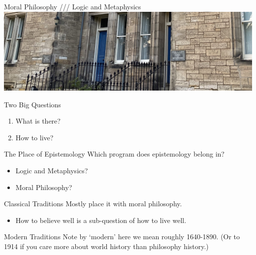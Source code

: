 \documentclass[
  17pt,
  letterpaper,
  ignorenonframetext,
  aspectratio=169,
  handout]{beamer}
\providecommand{\tightlist}{%
  \setlength{\itemsep}{0pt}\setlength{\parskip}{0pt}}\usepackage{longtable,booktabs,array}
\begin{document}
\begin{frame}{Moral Philosophy /// Logic and Metaphysics}
\protect\hypertarget{moral-philosophy-logic-and-metaphysics}{}
\includegraphics{../images/edgecliffe-doors.jpg}
\end{frame}

\begin{frame}{Two Big Questions}
\protect\hypertarget{two-big-questions}{}
\begin{enumerate}[<+->]
\tightlist
\item
  What is there?
\item
  How to live?
\end{enumerate}
\end{frame}

\begin{frame}{The Place of Epistemology}
\protect\hypertarget{the-place-of-epistemology-1}{}
Which program does epistemology belong in?

\begin{itemize}[<+->]
\tightlist
\item
  Logic and Metaphysics?
\item
  Moral Philosophy?
\end{itemize}
\end{frame}

\begin{frame}{Classical Traditions}
\protect\hypertarget{classical-traditions}{}
Mostly place it with moral philosophy.

\begin{itemize}[<+->]
\tightlist
\item
  How to believe well is a sub-question of how to live well.
\end{itemize}
\end{frame}

\begin{frame}{Modern Traditions}
\protect\hypertarget{modern-traditions}{}
Note by `modern' here we mean roughly 1640-1890. (Or to 1914 if you care
more about world history than philosophy history.)
\end{frame}
\end{document}
